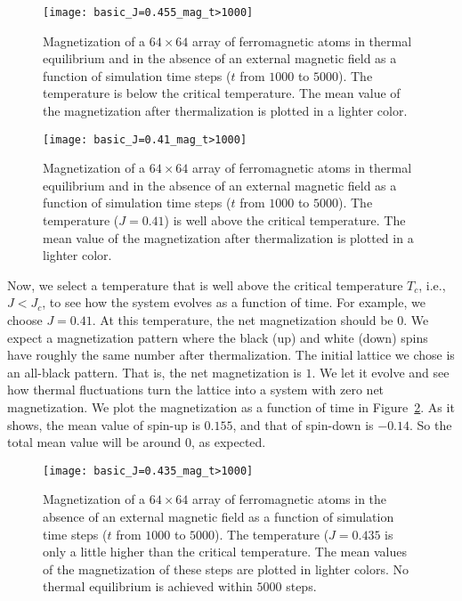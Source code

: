 \begin{figure}[hbt]
    \centering
    \texttt{[image: basic\_J=0.455\_mag\_t>1000]}
    \caption{Magnetization of a \(64 \times 64\) array of ferromagnetic atoms in thermal
        equilibrium and in the absence of an external magnetic field as a function of
        simulation time steps (\(t\) from \(1000\) to \(5000\)). The temperature is below the
        critical temperature. The mean value of the magnetization after thermalization is
        plotted in a lighter color.}
    \label{fig:mag_J=0.455}
\end{figure}

\begin{figure}[hbt]
    \centering
    \texttt{[image: basic\_J=0.41\_mag\_t>1000]}
    \caption{Magnetization of a \(64 \times 64\) array of ferromagnetic atoms in thermal
        equilibrium and in the absence of an external magnetic field as a function of
        simulation time steps (\(t\) from \(1000\) to \(5000\)). The temperature
        (\(J = 0.41\)) is well above the critical temperature. The mean value of the
        magnetization after thermalization is plotted in a lighter color.}
    \label{fig:mag_J=0.41}
\end{figure}

Now, we select a temperature that is well above the critical temperature \(T_c\),
i.e., \(J < J_c\), to see how the system evolves as a function of time.
For example, we choose \(J = 0.41\). At this temperature, the net magnetization should
be \(0\). We expect a magnetization pattern where the black (up) and
white (down) spins have roughly the same number after thermalization.
The initial lattice we chose is an all-black pattern. That is, the net magnetization
is \(1\). We let it evolve and see how thermal fluctuations turn the lattice into
a system with zero net magnetization.
We plot the magnetization as a function of time in Figure~\ref{fig:mag_J=0.41}.
As it shows, the mean value of spin-up is \(0.155\), and that of spin-down is \(-0.14\).
So the total mean value will be around \(0\), as expected.

\begin{figure}[hbt]
    \centering
    \texttt{[image: basic\_J=0.435\_mag\_t>1000]}
    \caption{Magnetization of a \(64 \times 64\) array of ferromagnetic atoms in the absence
        of an external magnetic field as a function of simulation time steps (\(t\) from
        \(1000\) to \(5000\)). The temperature (\(J = 0.435\) is only a little higher than
        the critical temperature. The mean values of the magnetization of these steps are
        plotted in lighter colors. No thermal equilibrium is achieved within \(5000\)
        steps.}
    \label{fig:mag_J=0.435}
\end{figure}

